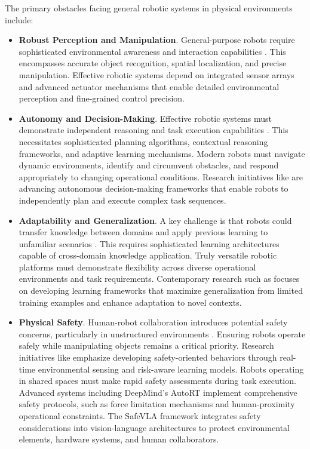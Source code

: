 The primary obstacles facing general robotic systems in physical environments include:
\begin{itemize}

    \item \textbf{Robust Perception and Manipulation}. General-purpose robots require sophisticated environmental awareness and interaction capabilities \cite{xia2022review,zhang2025towards}. This encompasses accurate object recognition, spatial localization, and precise manipulation. Effective robotic systems depend on integrated sensor arrays and advanced actuator mechanisms that enable detailed environmental perception and fine-grained control precision.
    
    \item \textbf{Autonomy and Decision-Making}. Effective robotic systems must demonstrate independent reasoning and task execution capabilities \cite{wu2024safety}. This necessitates sophisticated planning algorithms, contextual reasoning frameworks, and adaptive learning mechanisms. Modern robots must navigate dynamic environments, identify and circumvent obstacles, and respond appropriately to changing operational conditions. Research initiatives like \cite{10517611} are advancing autonomous decision-making frameworks that enable robots to independently plan and execute complex task sequences.
    
    \item \textbf{Adaptability and Generalization}. A key challenge is that robots could transfer knowledge between domains and apply previous learning to unfamiliar scenarios \cite{ju2024robo}. This requires sophisticated learning architectures capable of cross-domain knowledge application. Truly versatile robotic platforms must demonstrate flexibility across diverse operational environments and task requirements. Contemporary research such as \cite{bharadhwaj2024roboagent} focuses on developing learning frameworks that maximize generalization from limited training examples and enhance adaptation to novel contexts.
    
    \item \textbf{Physical Safety}. Human-robot collaboration introduces potential safety concerns, particularly in unstructured environments \cite{wu2024safety}. Ensuring robots operate safely while manipulating objects remains a critical priority. Research initiatives like \cite{10517611} emphasize developing safety-oriented behaviors through real-time environmental sensing and risk-aware learning models. Robots operating in shared spaces must make rapid safety assessments during task execution. Advanced systems including DeepMind's AutoRT \cite{ahn2024autort} implement comprehensive safety protocols, such as force limitation mechanisms and human-proximity operational constraints. The SafeVLA framework \cite{zhang2025safevla} integrates safety considerations into vision-language architectures to protect environmental elements, hardware systems, and human collaborators.
    

\end{itemize}
